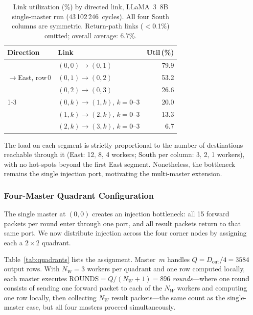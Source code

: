 \begin{table}[h]
\centering
\footnotesize
\setlength{\tabcolsep}{4pt}
\caption{Link utilization (\%) by directed link, LLaMA~3~8B single-master run
         (43\,102\,246~cycles).  All four South columns are symmetric.
         Return-path links ($<$0.1\%) omitted; overall average: 6.7\%.}
\label{tab:links-llama}
\begin{tabular}{@{}llr@{}}
\toprule
Direction & Link & Util\,(\%) \\
\midrule
\multirow{3}{*}{$\to$East, row\,0}
  & $(0,0)\!\to\!(0,1)$ & 79.9 \\
  & $(0,1)\!\to\!(0,2)$ & 53.2 \\
  & $(0,2)\!\to\!(0,3)$ & 26.6 \\
\cmidrule(l){1-3}
\multirow{3}{*}{$\to$South, all cols}
  & $(0,k)\!\to\!(1,k)$, $k=0\text{--}3$ & 20.0 \\
  & $(1,k)\!\to\!(2,k)$, $k=0\text{--}3$ & 13.3 \\
  & $(2,k)\!\to\!(3,k)$, $k=0\text{--}3$ &  6.7 \\
\bottomrule
\end{tabular}
\end{table}

The load on each segment is strictly proportional to the number of destinations
reachable through it (East: 12, 8, 4 workers; South per column: 3, 2, 1
workers), with no hot-spots beyond the first East segment.  Nonetheless, the
bottleneck remains the single injection port, motivating the multi-master
extension.

\subsubsection{Four-Master Quadrant Configuration}
\label{sec:4master}

The single master at $(0,0)$ creates an injection bottleneck: all 15 forward
packets per round enter through one port, and all result packets return to
that same port.  We now distribute injection across the four corner nodes by
assigning each a $2\times2$ quadrant.

Table~\ref{tab:quadrants} lists the assignment.  Master~$m$ handles
$Q = D_\text{out}/4 = 3584$ output rows.  With $N_W=3$ workers per quadrant
and one row computed locally, each master executes
$\mathrm{ROUNDS}=Q/(N_W+1)=896$ \emph{rounds}---where one round consists of
sending one forward packet to each of the $N_W$ workers and computing one row
locally, then collecting $N_W$ result packets---the same count as the
single-master case, but all four masters proceed simultaneously.

